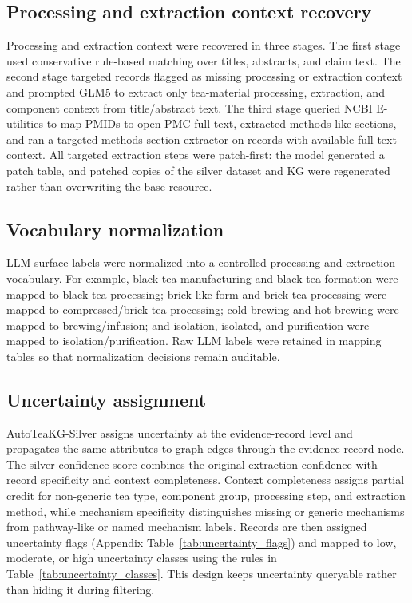 \documentclass[11pt]{article}
\begin{document}
\subsection{Processing and extraction context recovery}

Processing and extraction context were recovered in three stages. The first stage used conservative rule-based matching over titles, abstracts, and claim text. The second stage targeted records flagged as missing processing or extraction context and prompted GLM5 to extract only tea-material processing, extraction, and component context from title/abstract text. The third stage queried NCBI E-utilities to map PMIDs to open PMC full text, extracted methods-like sections, and ran a targeted methods-section extractor on records with available full-text context. All targeted extraction steps were patch-first: the model generated a patch table, and patched copies of the silver dataset and KG were regenerated rather than overwriting the base resource.

\subsection{Vocabulary normalization}

LLM surface labels were normalized into a controlled processing and extraction vocabulary. For example, black tea manufacturing and black tea formation were mapped to black tea processing; brick-like form and brick tea processing were mapped to compressed/brick tea processing; cold brewing and hot brewing were mapped to brewing/infusion; and isolation, isolated, and purification were mapped to isolation/purification. Raw LLM labels were retained in mapping tables so that normalization decisions remain auditable.

\subsection{Uncertainty assignment}

AutoTeaKG-Silver assigns uncertainty at the evidence-record level and propagates the same attributes to graph edges through the evidence-record node. The silver confidence score combines the original extraction confidence with record specificity and context completeness. Context completeness assigns partial credit for non-generic tea type, component group, processing step, and extraction method, while mechanism specificity distinguishes missing or generic mechanisms from pathway-like or named mechanism labels. Records are then assigned uncertainty flags (Appendix Table~\ref{tab:uncertainty_flags}) and mapped to low, moderate, or high uncertainty classes using the rules in Table~\ref{tab:uncertainty_classes}. This design keeps uncertainty queryable rather than hiding it during filtering.
\end{document}
